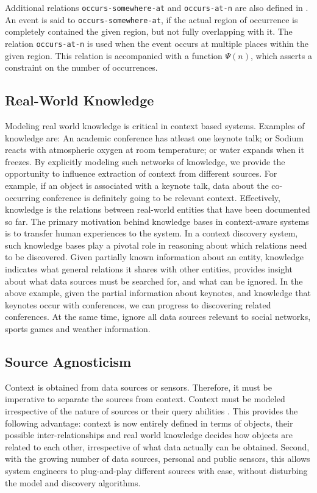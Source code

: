 Additional relations \texttt{occurs-somewhere-at} and \texttt{occurs-at-n} are also defined in \cite{gupta2011managing}. An event is said to \texttt{occurs-somewhere-at}, if the actual region of occurrence is completely contained the given region, but not fully overlapping with it. The relation \texttt{occurs-at-n} is used when the event occurs at multiple places within the given region. This relation is accompanied with a function $\Psi(n)$, which asserts a constraint on the number of occurrences. 

\subsection{Real-World Knowledge}
Modeling real world knowledge is critical in context based systems. Examples of knowledge are: An academic conference has atleast one keynote talk; or Sodium reacts with atmospheric oxygen at room temperature; or water expands when it freezes. By explicitly modeling such networks of knowledge, we provide the opportunity to influence extraction of context from different sources. For example, if an object is associated with a keynote talk, data about the co-occurring conference is definitely going to be relevant context. Effectively, knowledge is the relations between real-world entities that have been documented so far. The primary motivation behind knowledge bases in context-aware systems is to transfer human experiences to the system. In a context discovery system, such knowledge bases play a pivotal role in reasoning about which relations need to be discovered. Given partially known information about an entity, knowledge indicates what general relations it shares with other entities, provides insight about what data sources must be searched for, and what can be ignored. In the above example, given the partial information about keynotes, and knowledge that keynotes occur with conferences, we can progress to discovering related conferences. At the same time, ignore all data sources relevant to social networks, sports games and weather information.


\subsection{Source Agnosticism}
Context is obtained from data sources or sensors. Therefore, it must be imperative to separate the sources from context. Context must be modeled irrespective of the nature of sources or their query abilities \cite{yerneni1999computing}. This provides the following advantage: context is now entirely defined in terms of objects, their possible inter-relationships and real world knowledge decides how objects are related to each other, irrespective of what data actually can be obtained. Second, with the growing number of data sources, personal and public sensors, this allows system engineers to plug-and-play different sources with ease, without disturbing the model and discovery algorithms.

